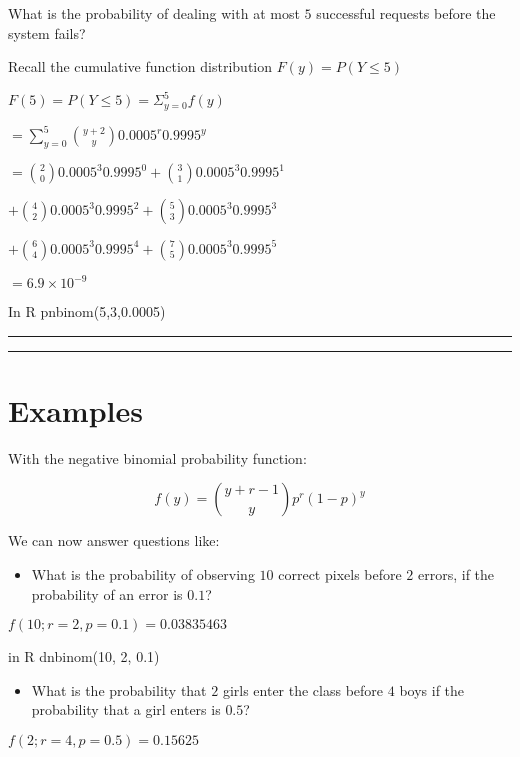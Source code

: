 \documentclass[
]{book}
\providecommand{\tightlist}{%
  \setlength{\itemsep}{0pt}\setlength{\parskip}{0pt}}
\begin{document}
What is the probability of dealing with at most \(5\) successful requests before the system fails?

Recall the cumulative function distribution \(F(y)=P(Y\leq 5)\)

\(F(5)=P(Y\leq 5)=\Sigma_{y=0}^5 f(y)\)

\(=\sum_{y=0}^5\binom {y+2} y 0.0005^r0.9995^y\)

\(=\binom {2} 0 0.0005^3 0.9995^0 +\binom {3} 1 0.0005^3 0.9995^1\)

\(+\binom {4} 2 0.0005^3 0.9995^2 +\binom {5} 3 0.0005^3 0.9995^3\)

\(+\binom {6} 4 0.0005^3 0.9995^4 +\binom {7} 5 0.0005^3 0.9995^5\)

\(= 6.9\times 10^{-9}\)

In R pnbinom(5,3,0.0005)

\begin{center}\rule{0.5\linewidth}{0.5pt}\end{center}

\begin{center}\rule{0.5\linewidth}{0.5pt}\end{center}

\hypertarget{examples}{%
\section{Examples}\label{examples}}

With the negative binomial probability function:

\[f(y)=\binom {y+r-1} y p^r (1-p)^y\]

We can now answer questions like:

\begin{itemize}
\tightlist
\item
  What is the probability of observing \(10\) correct pixels before \(2\) errors, if the probability of an error is \(0.1\)?
\end{itemize}

\(f(10; r=2, p=0.1)=0.03835463\)

in R dnbinom(10, 2, 0.1)

\begin{itemize}
\tightlist
\item
  What is the probability that \(2\) girls enter the class before \(4\) boys if the probability that a girl enters is \(0.5\)?
\end{itemize}

\(f(2; r=4, p=0.5)=0.15625\)
\end{document}
